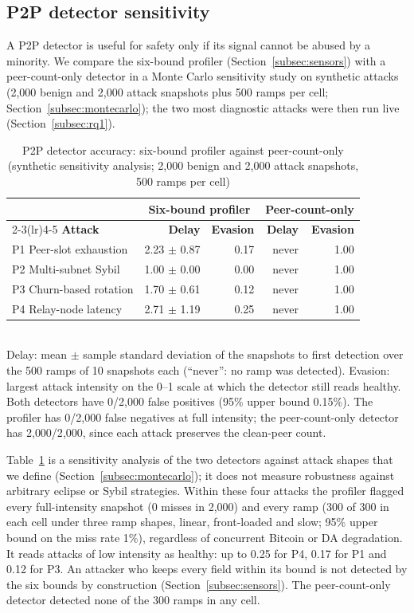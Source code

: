 \subsection*{P2P detector sensitivity}

A P2P detector is useful for safety only if its
signal cannot be abused by a minority. We compare the six-bound
profiler (Section~\ref{subsec:sensors}) with a peer-count-only detector in a
Monte Carlo sensitivity study on synthetic attacks (2{,}000 benign and 2{,}000
attack snapshots plus 500 ramps per cell; Section~\ref{subsec:montecarlo}); the
two most diagnostic attacks were then run live (Section~\ref{subsec:rq1}).

\begin{table}[h]
\caption{P2P detector accuracy: six-bound profiler against peer-count-only
(synthetic sensitivity analysis; 2{,}000 benign and 2{,}000 attack snapshots, 500 ramps per cell)}
\label{tab:p2p-detector}
\centering
\footnotesize
\setlength{\tabcolsep}{3pt}
\begin{tabular}{@{}lrrrr@{}}
\toprule
 & \multicolumn{2}{c}{\textbf{Six-bound profiler}} & \multicolumn{2}{c}{\textbf{Peer-count-only}} \\
\cmidrule(lr){2-3}\cmidrule(lr){4-5}
\textbf{Attack} & \textbf{Delay} & \textbf{Evasion} & \textbf{Delay} & \textbf{Evasion} \\
\midrule
P1 Peer-slot exhaustion & 2.23 $\pm$ 0.87 & 0.17 & never & 1.00 \\
P2 Multi-subnet Sybil & 1.00 $\pm$ 0.00 & 0.00 & never & 1.00 \\
P3 Churn-based rotation & 1.70 $\pm$ 0.61 & 0.12 & never & 1.00 \\
P4 Relay-node latency & 2.71 $\pm$ 1.19 & 0.25 & never & 1.00 \\
\bottomrule
\end{tabular}
\\[2pt]
\footnotesize Delay: mean $\pm$ sample standard deviation of the snapshots to
first detection over the 500 ramps of 10 snapshots each (``never'': no ramp
was detected). Evasion: largest attack intensity on
the 0--1 scale at which the detector still reads healthy. Both detectors have
0/2{,}000 false positives (95\% upper bound 0.15\%). The profiler has 0/2{,}000
false negatives at full intensity; the peer-count-only detector has
2{,}000/2{,}000, since each attack preserves the clean-peer count.
\end{table}

Table~\ref{tab:p2p-detector} is a sensitivity analysis of the two detectors
against attack shapes that we define (Section~\ref{subsec:montecarlo}); it does
not measure robustness against arbitrary eclipse or Sybil strategies. Within
these four attacks the profiler flagged every full-intensity snapshot (0 misses
in 2{,}000) and every ramp (300 of 300 in each cell under three ramp shapes,
linear, front-loaded and slow; 95\% upper bound on the miss rate 1\%),
regardless of concurrent Bitcoin or DA degradation. It reads attacks of low
intensity as healthy: up to 0.25 for P4, 0.17 for P1 and 0.12 for P3. An
attacker who keeps every field within its bound is not detected by the six bounds
by construction (Section~\ref{subsec:sensors}). The peer-count-only detector
detected none of the 300 ramps in any cell.

